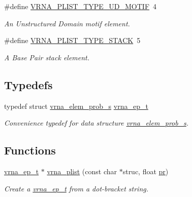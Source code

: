 \begin{DoxyCompactItemize}
\mbox{\label{group__struct__utils__plist_ga01d749cdb675dcdbac1dc5103378c699}} 
\#define \mbox{\hyperlink{group__struct__utils__plist_ga01d749cdb675dcdbac1dc5103378c699}{V\+R\+N\+A\+\_\+\+P\+L\+I\+S\+T\+\_\+\+T\+Y\+P\+E\+\_\+\+U\+D\+\_\+\+M\+O\+T\+IF}}~4
\begin{DoxyCompactList}\small\item\em An Unstructured Domain motif element. \end{DoxyCompactList}\item 
\mbox{\label{group__struct__utils__plist_ga36df728a95452170ca8684fc224299ea}} 
\#define \mbox{\hyperlink{group__struct__utils__plist_ga36df728a95452170ca8684fc224299ea}{V\+R\+N\+A\+\_\+\+P\+L\+I\+S\+T\+\_\+\+T\+Y\+P\+E\+\_\+\+S\+T\+A\+CK}}~5
\begin{DoxyCompactList}\small\item\em A Base Pair stack element. \end{DoxyCompactList}\end{DoxyCompactItemize}
\subsection*{Typedefs}
\begin{DoxyCompactItemize}
\item 
\mbox{\label{group__struct__utils__plist_gab9ac98ab55ded9fb90043b024b915aca}} 
typedef struct \mbox{\hyperlink{group__struct__utils__plist_structvrna__elem__prob__s}{vrna\+\_\+elem\+\_\+prob\+\_\+s}} \mbox{\hyperlink{group__struct__utils__plist_gab9ac98ab55ded9fb90043b024b915aca}{vrna\+\_\+ep\+\_\+t}}
\begin{DoxyCompactList}\small\item\em Convenience typedef for data structure \mbox{\hyperlink{group__struct__utils__plist_structvrna__elem__prob__s}{vrna\+\_\+elem\+\_\+prob\+\_\+s}}. \end{DoxyCompactList}\end{DoxyCompactItemize}
\subsection*{Functions}
\begin{DoxyCompactItemize}
\item 
\mbox{\hyperlink{group__struct__utils__plist_gab9ac98ab55ded9fb90043b024b915aca}{vrna\+\_\+ep\+\_\+t}} $\ast$ \mbox{\hyperlink{group__struct__utils__plist_gaf002d69024d709744664a8b9ca3dd77d}{vrna\+\_\+plist}} (const char $\ast$struc, float \mbox{\hyperlink{fold__vars_8h_ac98ec419070aee6831b44e5c700f090f}{pr}})
\begin{DoxyCompactList}\small\item\em Create a \mbox{\hyperlink{group__struct__utils__plist_gab9ac98ab55ded9fb90043b024b915aca}{vrna\+\_\+ep\+\_\+t}} from a dot-\/bracket string. \end{DoxyCompactList}\end{DoxyCompactItemize}


